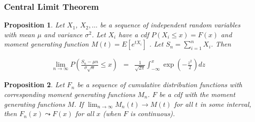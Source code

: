 \documentclass{beamer}
\newtheorem{prop}{Proposition}
\numberwithin{equation}{section}
\begin{document}
\begin{frame}
\frametitle{Central Limit Theorem}

\begin{prop}
Let $X_{1}$, $X_{2}, \hdots$ be a sequence of independent random variables with mean $\mu$ and variance $\sigma^2$.  Let $X_{i}$ have a cdf $P(X_{i} \leq x) = F(x)$ and moment generating function $M(t) = E[e^{tX_{i}}]$ .  Let $S_{n} = \sum_{i=1}^{n} X_{i}$.  Then 

\begin{eqnarray}
\lim_{n\rightarrow \infty} P\left( \frac{S_{n} - \mu n }{\sigma\sqrt{n}} \leq x \right) &  = &  \frac{1}{\sqrt{2\pi} } \int_{-\infty}^{x} \exp\left( -\frac{z^{2} }{2} \right) dz \nonumber 
\end{eqnarray}


\end{prop}

\pause 
{}
\begin{itemize}
\end{itemize}


\end{frame}


\begin{frame}

\begin{prop}
Let $F_{n}$ be a sequence of cumulative distribution functions with corresponding moment generating functions $M_{n}$.  $F$ be a cdf with the moment generating functions $M$.  If $\lim_{n\rightarrow \infty} M_{n}(t) \rightarrow M(t)$ for all $t$ in some interval, then $F_{n}(x) \leadsto F(x)$ for all $x$ (when $F$ is continuous).  
\end{prop}

\pause 
{}

\pause 




\end{frame}
\end{document}
